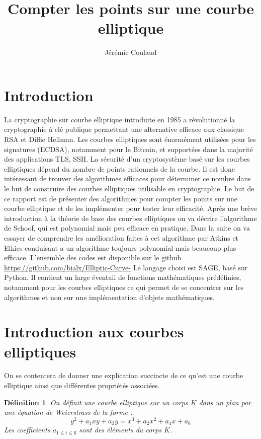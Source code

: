 \documentclass[12pt]{article}
\title{Compter les points sur une courbe elliptique}
\author{Jérémie Coulaud}
\begin{document}
\newtheorem{prop}{Proposition}
\newtheorem{defi}{Définition}
\newtheorem{thm}{Théorème}
\maketitle
\newpage
\tableofcontents
\newpage

\section{Introduction}
La cryptographie sur courbe elliptique introduite en 1985 a révolutionné la cryptographie à clé publique permettant une alternative efficace aux classique RSA et Diffie Hellman. Les courbes elliptiques sont énormément utilisées pour les signatures (ECDSA), notamment pour le Bitcoin, et supportées dans la majorité des applications TLS, SSH. La sécurité d'un cryptosystème basé sur les courbes elliptiques dépend du nombre de points rationnels de la courbe. Il est donc intéressant de trouver des algorithmes efficaces pour déterminer ce nombre dans le but de construire des courbes elliptiques utilisable en cryptographie.
Le but de ce rapport est de présenter des algorithmes pour compter les points sur une courbe elliptique et de les implémenter pour tester leur efficacité. Après une brève introduction à la théorie de base des courbes elliptiques on va décrire l'algorithme de Schoof, qui est polynomial mais peu efficace en pratique. Dans la suite on va essayer de comprendre les amélioration faites à cet algorithme par Atkins et Elkies conduisant a un algorithme toujours polynomial mais beaucoup plus efficace.
\newline
L'ensemble des codes est disponible sur le github \url{https://github.com/bialx/Elliptic-Curve-} Le langage choisi est SAGE, basé sur Python. Il contient un large éventail de fonctions mathématiques prédéfinies, notamment pour les courbes elliptiques ce qui permet de se concentrer sur les algorithmes et non sur une implémentation d'objets mathématiques.
\section{Introduction aux courbes elliptiques}
 On se contentera de donner une explication succincte de ce qu'est une courbe elliptique ainsi que différentes propriétés associées.

\begin{defi}
On définit une courbe elliptique sur un corps $K$ dans un plan par une équation de Weierstrass de la forme : 
\begin{equation*}
y^2 + a_1xy + a_3y  = x^3 + a_2x^2 + a_4x + a_6
\end{equation*}
Les coefficients $a_{1 \leq i \leq 6}$ sont des éléments du corps $K$.
\end{defi}
\end{document}
